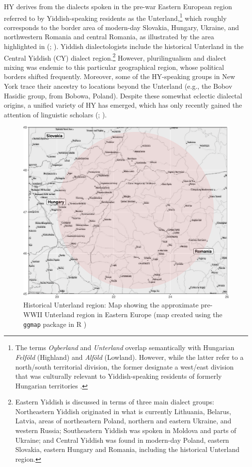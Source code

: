 \documentclass[output=paper]{langsci/langscibook}
\begin{document}
HY derives from the dialects spoken in the pre-war Eastern European region referred to by Yiddish-speaking residents as the Unterland,\footnote{The terms \textit{Oyberland} and \textit{Unterland} overlap semantically with Hungarian \textit{Felföld} (Highland) and \textit{Alföld} (Lowland). However, while the latter refer to a north/south territorial division, the former designate a west/east division that was culturally relevant to Yiddish-speaking residents of formerly Hungarian territories \citep{Weinreich1964}.} which roughly corresponds to the border area of modern-day Slovakia, Hungary, Ukraine, and northwestern Romania and central Romania, as illustrated by the area highlighted in  (\citealt{Weinreich1964}; \citealt{Krogh2012}). Yiddish dialectologists include the historical Unterland in the Central Yiddish (CY) dialect region.\footnote{Eastern Yiddish is discussed in terms of three main dialect groups: Northeastern Yiddish originated in what is currently Lithuania, Belarus, Latvia, areas of northeastern Poland, northern and eastern Ukraine, and western Russia; Southeastern Yiddish was spoken in Moldova and parts of Ukraine; and Central Yiddish was found in modern-day Poland, eastern Slovakia, eastern Hungary and Romania, including the historical Unterland region.} However, plurilingualism and dialect mixing was endemic to this particular geographical region, whose political borders shifted frequently. Moreover, some of the HY-speaking groups in New York trace their ancestry to locations beyond the Unterland (e.g., the Bobov Hasidic group, from Bobowa, Poland). Despite these somewhat eclectic dialectal origins, a unified variety of HY has emerged, which has only recently gained the attention of linguistic scholars (\citealt{Nove2018a}; \citealt{SadockMasor2018}). 

\begin{figure}
\includegraphics[width=\textwidth]{figures/nove-fig2-gray.pdf}
\caption{Historical Unterland region: Map showing the approximate pre-WWII Unterland region in Eastern Europe (map created using the \texttt{ggmap} package \citep{KahleWickham2013} in R \citep{RCore2017})\label{fig:nove:2}}
\end{figure}
\end{document}
